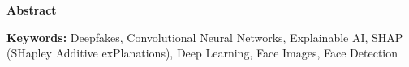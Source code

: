 \pagestyle{plain}
\vspace*{52pt}
\begin{center}
    \large{\textbf{Abstract}}\\[31pt]
\end{center}


\begin{flushleft}
    \textbf{Keywords:} Deepfakes, Convolutional Neural Networks, Explainable AI, SHAP (SHapley Additive exPlanations), Deep Learning, Face Images, Face Detection
\end{flushleft}

